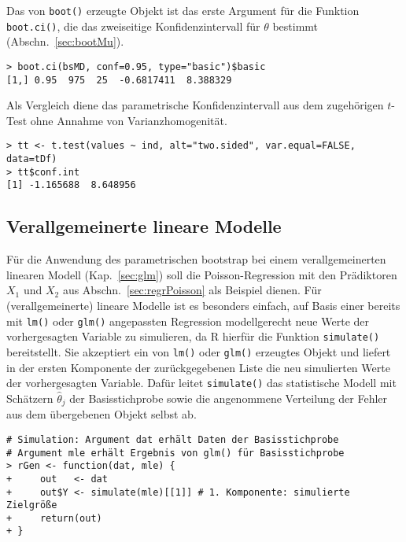 Das von \lstinline!boot()! erzeugte Objekt ist das erste Argument für die Funktion \lstinline!boot.ci()!, die das zweiseitige Konfidenzintervall für $\theta$ bestimmt (Abschn.\ \ref{sec:bootMu}).
\begin{lstlisting}
> boot.ci(bsMD, conf=0.95, type="basic")$basic
[1,] 0.95  975  25  -0.6817411  8.388329
\end{lstlisting}

Als Vergleich diene das parametrische Konfidenzintervall aus dem zugehörigen $t$-Test ohne Annahme von Varianzhomogenität.
\begin{lstlisting}
> tt <- t.test(values ~ ind, alt="two.sided", var.equal=FALSE, data=tDf)
> tt$conf.int
[1] -1.165688  8.648956
\end{lstlisting}

\subsection{Verallgemeinerte lineare Modelle}
\label{sec:bootParamGLM}

Für die Anwendung des parametrischen bootstrap bei einem verallgemeinerten linearen Modell (Kap.\ \ref{sec:glm}) soll die Poisson-Regression mit den Prädiktoren $X_{1}$ und $X_{2}$ aus Abschn.\ \ref{sec:regrPoisson} als Beispiel dienen. Für (verallgemeinerte) lineare Modelle ist es besonders einfach, auf Basis einer bereits mit \lstinline!lm()! oder \lstinline!glm()! angepassten Regression modellgerecht neue Werte der vorhergesagten Variable zu simulieren, da R hierfür die Funktion  \lstinline!simulate()! bereitstellt. Sie akzeptiert ein von \lstinline!lm()! oder \lstinline!glm()! erzeugtes Objekt und liefert in der ersten Komponente der zurückgegebenen Liste die neu simulierten Werte der vorhergesagten Variable. Dafür leitet \lstinline!simulate()! das statistische Modell mit Schätzern $\hat{\theta}_{j}$ der Basisstichprobe sowie die angenommene Verteilung der Fehler aus dem übergebenen Objekt selbst ab.
\begin{lstlisting}
# Simulation: Argument dat erhält Daten der Basisstichprobe
# Argument mle erhält Ergebnis von glm() für Basisstichprobe
> rGen <- function(dat, mle) {
+     out   <- dat
+     out$Y <- simulate(mle)[[1]] # 1. Komponente: simulierte Zielgröße
+     return(out)
+ }
\end{lstlisting}

